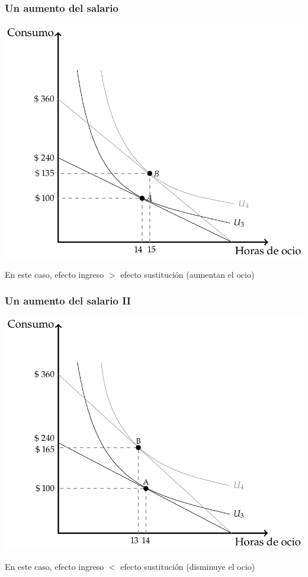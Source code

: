 \documentclass{beamer}
\begin{document}
\begin{frame}
\frametitle{Un aumento del salario}
\begin{center}
\includegraphics[scale=0.45]{../Figures/C9.8.png}
\end{center}
En este caso, efecto ingreso $>$ efecto sustitución (aumentan el ocio)
\end{frame}

\begin{frame}
\frametitle{Un aumento del salario II}
\begin{center}
\includegraphics[scale=0.5]{../Figures/C9.9.png}
\end{center}
En este caso, efecto ingreso $<$ efecto sustitución (disminuye el ocio)
\end{frame}
\end{document}
